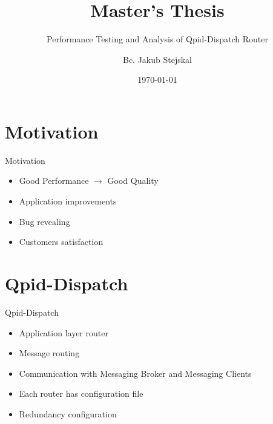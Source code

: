 \documentclass[hyperref={pdfpagelabels=false, unicode},pdf,slideColor,fyma,9pt]{beamer}
\title{Master's Thesis}
\subtitle{Performance Testing and Analysis of Qpid-Dispatch Router}
\author[]{Bc. Jakub Stejskal}
\institute[FIT]{Faculty of Information Technology}
\date[]{\today}
\begin{document}
		\begin{frame}
				\titlepage
		\end{frame}
		
		\section{Motivation}
		\begin{frame}{Motivation}
				\begin{itemize}
						\item Good Performance $\rightarrow$ Good Quality
						\item Application improvements
						\item Bug revealing
						\item Customers satisfaction
				\end{itemize}
		\end{frame}
		\section{Qpid-Dispatch}
		\begin{frame}{Qpid-Dispatch}
				\begin{itemize}
						\item Application layer router 
						\item Message routing
						\item Communication with Messaging Broker and Messaging Clients		
						\item Each router has configuration file 
						\item Redundancy configuration
				\end{itemize}						
		\end{frame}
\end{document}
